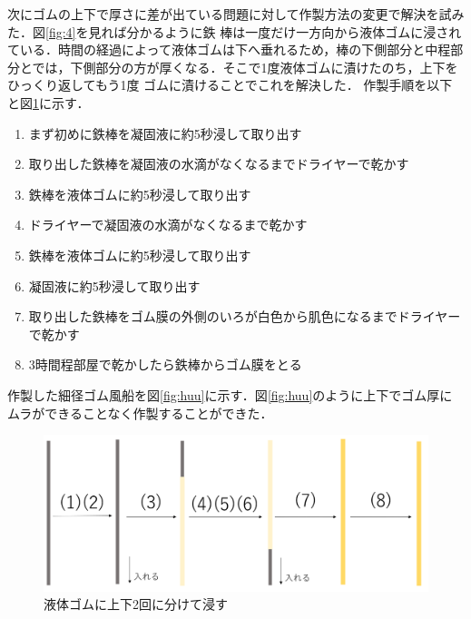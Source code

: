\newpage
次にゴムの上下で厚さに差が出ている問題に対して作製方法の変更で解決を試みた．図\ref{fig:4}を見れば分かるように鉄
棒は一度だけ一方向から液体ゴムに浸されている．時間の経過によって液体ゴムは下へ垂れるため，棒の下側部分と中程部分とでは，下側部分の方が厚くなる．そこで1度液体ゴムに漬けたのち，上下をひっくり返してもう1度
ゴムに漬けることでこれを解決した．
作製手順を以下と図\ref{fig:2kai}に示す．
\begin{enumerate}
  \item まず初めに鉄棒を凝固液に約5秒浸して取り出す
  \item 取り出した鉄棒を凝固液の水滴がなくなるまでドライヤーで乾かす
  \item 鉄棒を液体ゴムに約5秒浸して取り出す
  \item ドライヤーで凝固液の水滴がなくなるまで乾かす
  \item 鉄棒を液体ゴムに約5秒浸して取り出す
  \item 凝固液に約5秒浸して取り出す
  \item 取り出した鉄棒をゴム膜の外側のいろが白色から肌色になるまでドライヤーで乾かす
  \item 3時間程部屋で乾かしたら鉄棒からゴム膜をとる
\end{enumerate}
作製した細径ゴム風船を図\ref{fig:huu}に示す．図\ref{fig:huu}のように上下でゴム厚にムラができることなく作製することができた．
\begin{figure}[!h]
  \centering  %
  \includegraphics[scale=0.35]{pic/tezyun2.PNG}
  \caption{液体ゴムに上下2回に分けて浸す}
  \label{fig:2kai}
\end{figure}
